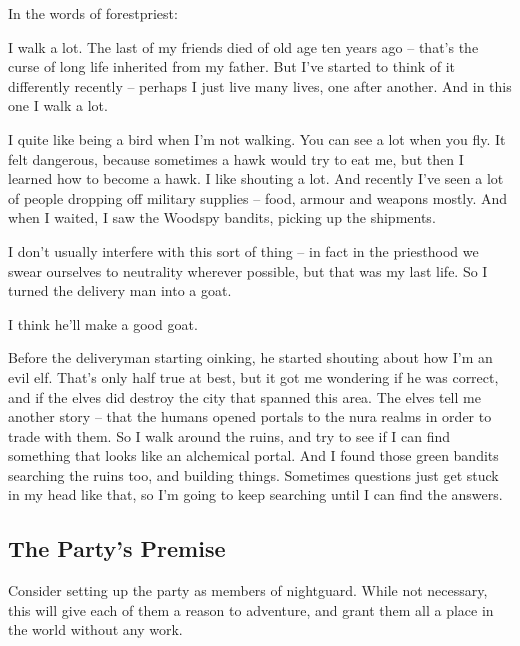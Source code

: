 \begin{multicols}{2}
\begin{exampletext}
\end{exampletext}

In the words of \gls{forestpriest}:

\begin{exampletext}

  I walk a lot.
  The last of my friends died of old age ten years ago -- that's the curse of long life inherited from my father.
  But I've started to think of it differently recently -- perhaps I just live many lives, one after another.
  And in this one I walk a lot.

  I quite like being a bird when I'm not walking.
  You can see a lot when you fly.
  It felt dangerous, because sometimes a hawk would try to eat me, but then I learned how to become a hawk.
  I like shouting a lot.
  And recently I've seen a lot of people dropping off military supplies -- food, armour and weapons mostly.
  And when I waited, I saw the Woodspy bandits, picking up the shipments.
  
  I don't usually interfere with this sort of thing -- in fact in the priesthood we swear ourselves to neutrality wherever possible, but that was my last life.
  So I turned the delivery man into a goat.

  I think he'll make a good goat.

  Before the deliveryman starting oinking, he started shouting about how I'm an evil elf.
  That's only half true at best, but it got me wondering if he was correct, and if the elves did destroy the city that spanned this area.
  The elves tell me another story -- that the humans opened portals to the nura realms in order to trade with them.
  So I walk around the ruins, and try to see if I can find something that looks like an alchemical portal.
  And I found those green bandits searching the ruins too, and building things.
  Sometimes questions just get stuck in my head like that, so I'm going to keep searching until I can find the answers.

\end{exampletext}

\subsection{The Party's Premise}

Consider setting up the party as members of \gls{nightguard}.
While not necessary, this will give each of them a reason to adventure, and grant them all a place in the world without any work.

\end{multicols}
